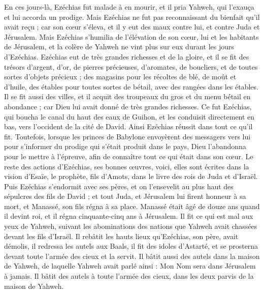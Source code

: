 \begin{multicols}{2}
En ces jours-là, Ezéchias fut malade à en mourir, et il pria Yahweh, qui l'exauça et lui accorda un prodige.
Mais Ezéchias ne fut pas reconnaissant du bienfait qu'il avait reçu ; car son cœur s'éleva, et il y eut des maux contre lui, et contre Juda et Jérusalem.
Mais Ezéchias s'humilia de l'élévation de son cœur, lui et les habitants de Jérusalem, et la colère de Yahweh ne vint plus sur eux durant les jours d'Ezéchias.
Ezéchias eut de très grandes richesses et de la gloire, et il se fit des trésors d'argent, d'or, de pierres précieuses, d'aromates, de boucliers, et de toutes sortes d'objets précieux ;
des magasins pour les récoltes de blé, de moût et d'huile, des étables pour toutes sortes de bétail, avec des rangées dans les étables.
Il se fit aussi des villes, et il acquit des troupeaux du gros et du menu bétail en abondance ; car Dieu lui avait donné de très grandes richesses.
Ce fut Ezéchias, qui boucha le canal du haut des eaux de Guihon, et les conduisit directement en bas, vers l'occident de la cité de David. Ainsi Ezéchias réussit dans tout ce qu'il fit.
Toutefois, lorsque les princes de Babylone envoyèrent des messagers vers lui pour s'informer du prodige qui s'était produit dans le pays, Dieu l'abandonna pour le mettre à l'épreuve, afin de connaître tout ce qui était dans son cœur.
Le reste des actions d'Ezéchias, ses bonnes œuvres, voici, elles sont écrites dans la vision d'Esaïe, le prophète, fils d'Amots, dans le livre des rois de Juda et d'Israël.
Puis Ezéchias s'endormit avec ses pères, et on l'ensevelit au plus haut des sépulcres des fils de David ; et tout Juda, et Jérusalem lui firent honneur à sa mort, et Manassé, son fils régna à sa place.
\VerseOne{}Manassé était âgé de douze ans quand il devint roi, et il régna cinquante-cinq ans à Jérusalem.
Il fit ce qui est mal aux yeux de Yahweh, suivant les abominations des nations que Yahweh avait chassées devant les fils d'Israël.
Il rebâtit les hauts lieux qu'Ezéchias, son père, avait démolis, il redressa les autels aux Baals, il fit des idoles d'Astarté, et se prosterna devant toute l'armée des cieux et la servit.
Il bâtit aussi des autels dans la maison de Yahweh, de laquelle Yahweh avait parlé ainsi : Mon Nom sera dans Jérusalem à jamais.
Il bâtit des autels à toute l'armée des cieux, dans les deux parvis de la maison de Yahweh.

\end{multicols}
